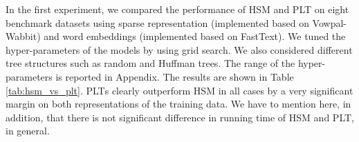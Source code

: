 \documentclass{article}
\newcommand{\Algo}[1]{\textsc{#1}}
\newcommand{\data}[3]{
    \begin{tabular}{ll}
    \rule{0pt}{0pt} #1 \\
    \rule{0pt}{0pt} #2 \\
    \rule{0pt}{0pt} #3 \\
    \end{tabular}
}
\newcommand{\databf}[3]{
    \textbf{
	\begin{tabular}{ll}
    \rule{0pt}{0pt} #1 \\
    \rule{0pt}{0pt} #2 \\
    \rule{0pt}{0pt} #3 \\
    \end{tabular}
	}
}
\begin{document}
\begin{table*}[ht!]
\begin{center}
        \end{center}
	\vspace{-0.5cm}
\end{table*}
%
In the first experiment, we compared the performance of \Algo{HSM} and \Algo{PLT} on eight benchmark datasets using sparse representation (implemented based on Vowpal-Wabbit) and word embeddings (implemented based on FastText).
%
We tuned the hyper-parameters of the models by using grid search. We also considered different tree structures such as random and Huffman trees. The range of the hyper-parameters is reported in Appendix. The results are shown in Table \ref{tab:hsm_vs_plt}. \Algo{PLT}s clearly outperform \Algo{HSM} in all cases by a very significant margin on both representations of the training data. We have to mention here, in addition,  that there is not significant difference in running time of \Algo{HSM} and \Algo{PLT}, in general.
\end{document}
